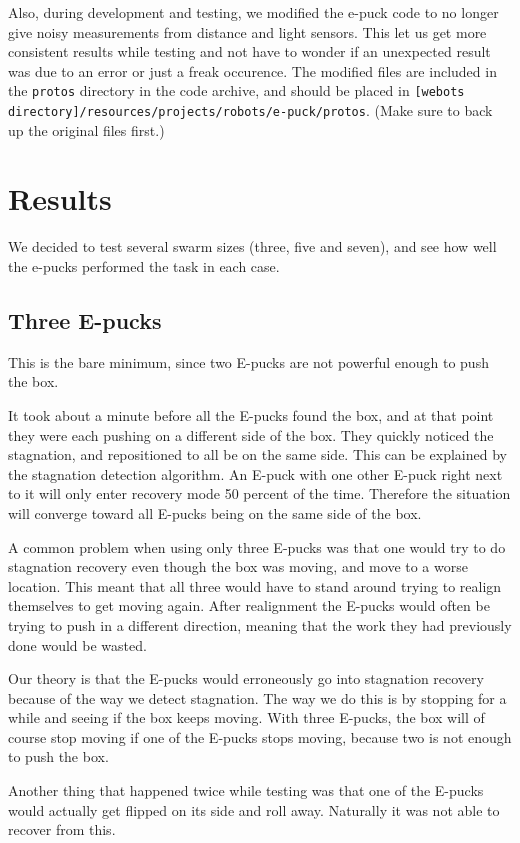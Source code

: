 \documentclass[a4paper,12pt]{article}
\begin{document}
Also, during development and testing, we modified the e-puck code to no longer give noisy measurements from distance and light sensors. This let us get more consistent results while testing and not have to wonder if an unexpected result was due to an error or just a freak occurence. The modified files are included in the \texttt{protos} directory in the code archive, and should be placed in \texttt{[webots directory]/resources/projects/robots/e-puck/protos}. (Make sure to back up the original files first.)

\section{Results}
We decided to test several swarm sizes (three, five and seven), and see how well the e-pucks performed the task in each case.
\subsection{Three E-pucks}
This is the bare minimum, since two E-pucks are not powerful enough to push the box.

It took about a minute before all the E-pucks found the box, and at that point they were each pushing on a different side of the box. They quickly noticed the stagnation, and repositioned to all be on the same side. This can be explained by the stagnation detection algorithm. An E-puck with one other E-puck right next to it will only enter recovery mode 50 percent of the time. Therefore the situation will converge toward all E-pucks being on the same side of the box.

A common problem when using only three E-pucks was that one would try to do stagnation recovery even though the box was moving, and move to a worse location. This meant that all three would have to stand around trying to realign themselves to get moving again. After realignment the E-pucks would often be trying to push in a different direction, meaning that the work they had previously done would be wasted. 

Our theory is that the E-pucks would erroneously go into stagnation recovery because of the way we detect stagnation. The way we do this is by stopping for a while and seeing if the box keeps moving. With three E-pucks, the box will of course stop moving if one of the E-pucks stops moving, because two is not enough to push the box.

Another thing that happened twice while testing was that one of the E-pucks would actually get flipped on its side and roll away. Naturally it was not able to recover from this.
\end{document}
